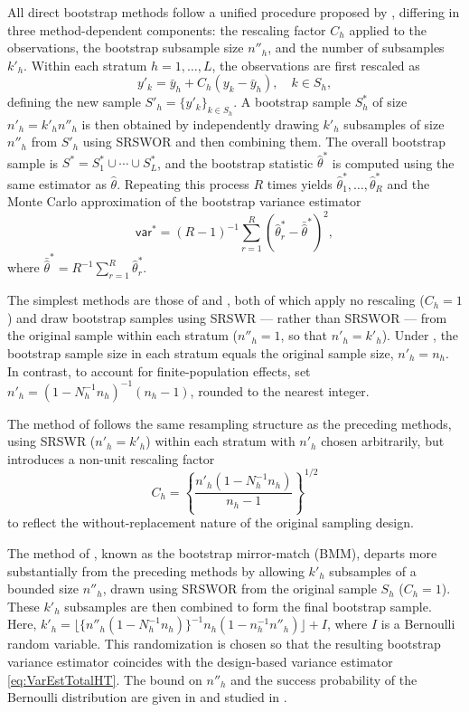 All direct bootstrap methods follow a unified procedure proposed by \citet{Mashreghi:Haziza:Leger:2016}, differing in three method-dependent components: the rescaling factor \(C_h\) applied to the observations, the bootstrap subsample size \(n''_h\), and the number of subsamples \(k'_h\). Within each stratum \(h = 1, \ldots, L\), the observations are first rescaled as
\[
    y'_k = \bar{y}_h + C_h(y_k - \bar{y}_h), \quad k \in \textrm{$S$}_h,
\]
defining the new sample \(\textrm{$S$}'_h = \{y'_k\}_{k \in \textrm{$S$}_h}\). A bootstrap sample \(\textrm{$S$}_h^*\) of size \(n'_h = k'_h n''_h\) is then obtained by independently drawing \(k'_h\) subsamples of size \(n''_h\) from \(\textrm{$S$}'_h\) using SRSWOR and then combining them. The overall bootstrap sample is \(\textrm{$S$}^* = \textrm{$S$}_1^* \cup \cdots \cup \textrm{$S$}_L^*\), and the bootstrap statistic \(\hat{\theta}^*\) is computed using the same estimator as \(\hat{\theta}\). Repeating this process \(R\) times yields \(\hat{\theta}_1^*,\ldots,\hat{\theta}_R^*\) and the Monte Carlo approximation of the bootstrap variance estimator
\begin{equation}
    \mathsf{var}^* = (R - 1)^{-1} \sum_{r=1}^{R} (\hat{\theta}_r^* - \bar{\hat{\theta}}^*)^2,
    \label{eq:MCVarOneloop}
\end{equation}
where \(\bar{\hat{\theta}}^* = R^{-1} \sum_{r=1}^{R} \hat{\theta}_r^*\).

The simplest methods are those of \citet{Efron:1979} and \citet{McCarthy:Snowden:1985}, both of which apply no rescaling (\(C_h = 1\)) and draw bootstrap samples using SRSWR --- rather than SRSWOR --- from the original sample within each stratum (\(n''_h = 1\), so that \(n'_h = k'_h\)). Under \citet{Efron:1979}, the bootstrap sample size in each stratum equals the original sample size, \(n'_h = n_h\). In contrast, to account for finite-population effects, \citet{McCarthy:Snowden:1985} set \(n'_h = (1 - N_h^{-1}n_h)^{-1}(n_h - 1)\), rounded to the nearest integer.

The method of \citet{Rao:Wu:1988} follows the same resampling structure as the preceding methods, using SRSWR (\(n'_h = k'_h\)) within each stratum with \(n'_h\) chosen arbitrarily, but introduces a non-unit rescaling factor
\[
    C_h = \left\{\frac{n'_h(1 - N_h^{-1}n_h)}{n_h - 1}\right\}^{1/2}
\]
to reflect the without-replacement nature of the original sampling design.

The method of \citet{Sitter:1992b}, known as the bootstrap mirror-match (BMM), departs more substantially from the preceding methods by allowing \(k'_h\) subsamples of a bounded size \(n''_h\), drawn using SRSWOR from the original sample \(\textrm{$S$}_h\) (\(C_h = 1\)). These \(k'_h\) subsamples are then combined to form the final bootstrap sample. Here, \(k'_h =\lfloor \{n''_h(1 - N_h^{-1} n_h)\}^{-1} n_h(1 - n_h^{-1} n''_h) \rfloor + I\), where \(I\) is a Bernoulli random variable. This randomization is chosen so that the resulting bootstrap variance estimator coincides with the design-based variance estimator \eqref{eq:VarEstTotalHT}. The bound on \(n''_h\) and the success probability of the Bernoulli distribution are given in \citet{Sitter:1992b} and studied in \citet{Mashreghi:Haziza:Leger:2016}.


